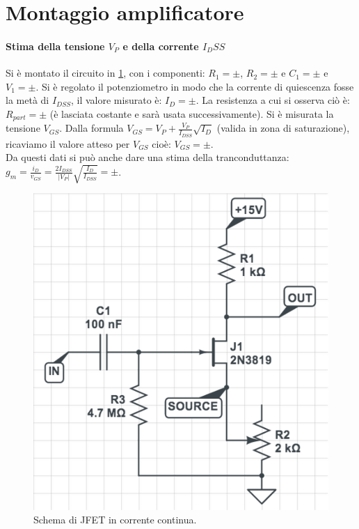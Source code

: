 \documentclass[10pt,a4paper]{article}
\begin{document}
\section{Montaggio amplificatore}
\paragraph{Stima della tensione $V_P$ e della corrente $I_DSS$}
Si è montato il circuito in \ref{circuito2}, con i componenti: $R_1 = \pm$, $R_2 = \pm $ e $C_1 = \pm$ e $V_1 = \pm $. Si è regolato il potenziometro in modo che la corrente di quiescenza fosse la metà di $I_{DSS}$, il valore misurato è: $I_D = \pm $. La resistenza a cui si osserva ciò è: $R_{part} = \pm $ (è lasciata costante e sarà usata successivamente). Si è misurata la tensione $V_{GS}$. Dalla formula $V_{GS} = V_{P} + \frac{V_P}{I_{DSS}} \sqrt{I_D}$ (valida in zona di saturazione), ricaviamo il valore atteso per $V_{GS}$ cioè: $V_{GS} =  \pm$.\\ 
Da questi dati si può anche dare una stima della tranconduttanza: $g_m = \frac{i_D}{v_{GS}} = \frac{2I_{DSS}}{\vert V_P \vert} \sqrt{\frac{I_D}{I_{DSS}}} = \pm$. 


\begin{figure}
\centering
\includegraphics[scale=0.4]{circuito2.png}
\caption{Schema di JFET in corrente continua.\label{circuito2}}
\end{figure}
\end{document}

